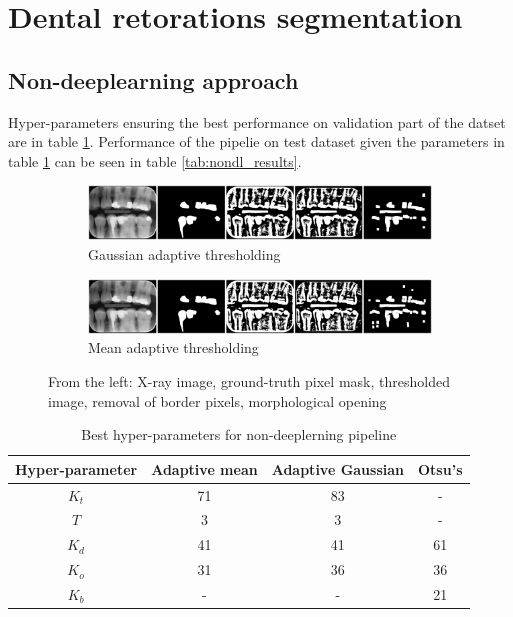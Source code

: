 \section{Dental retorations segmentation}
\subsection{Non-deeplearning approach}
Hyper-parameters ensuring the best performance on validation part of the datset are in table \ref{tab:nondl_restorations:best_params}. Performance of the pipelie on test dataset given the parameters in table \ref{tab:nondl_restorations:best_params} can be seen in table \ref{tab:nondl_results}.

\begin{figure}[H]
    \centering
    \begin{subfigure}[b]{\textwidth}
        \includegraphics[width=1\linewidth]{images/segmentation_nondl_gauss_12.pdf}
        \caption{Gaussian adaptive thresholding}
    \end{subfigure}

    \begin{subfigure}[b]{\textwidth}
        \includegraphics[width=1\linewidth]{images/segmentation_nondl_mean_12.pdf}
        \caption{Mean adaptive thresholding}
    \end{subfigure}
    \caption{From the left: X-ray image, ground-truth pixel mask, thresholded image, removal of border pixels, morphological opening}
\end{figure}

\begin{table}[H]
    \begin{tabular}{|c|c|c|c|}
        \hline
        Hyper-parameter & Adaptive mean & Adaptive Gaussian & Otsu's \\ \hline
        $K_t$           & 71            & 83                & -      \\ \hline
        $T$             & 3             & 3                 & -      \\ \hline
        $K_d$           & 41            & 41                & 61     \\ \hline
        $K_o$           & 31            & 36                & 36     \\ \hline
        $K_b$           & -             & -                 & 21     \\ \hline
    \end{tabular}
    \caption{Best hyper-parameters for non-deeplerning pipeline}
    \label{tab:nondl_restorations:best_params}
\end{table}


